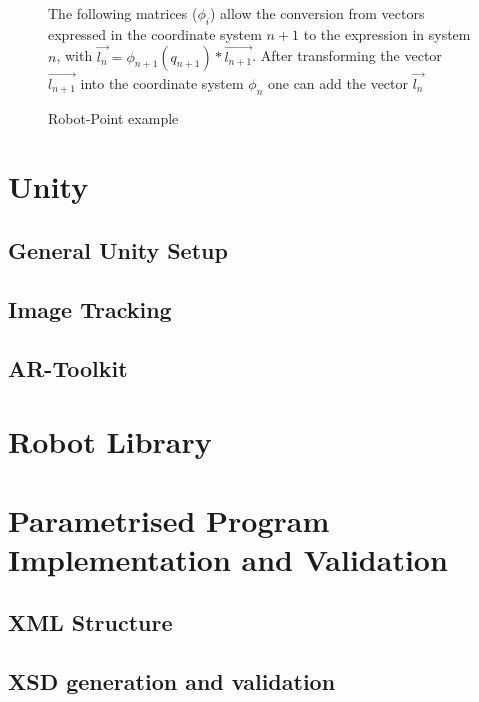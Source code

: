 \begin{figure}[h!]
	\begin{minipage}{0.45\textwidth}
		\centering
		
		\caption{Robot-Point example}
		\label{Fig:ForwardKinematics}
	\end{minipage}\hfill
	\begin{minipage}{0.45\textwidth}
		The following matrices ($\phi_i$) allow the conversion from vectors expressed in the coordinate system $n + 1$ to the expression in system $n$, with $\vec{l_n} = \phi_{n+1}(q_{n+1}) * \vec{l_{n+1}}$. After transforming the vector $\vec{l_{n+1}}$ into the coordinate system $\phi_n$ one can add the vector $\vec{l_n}$
	\end{minipage}
\end{figure}
	
\section{Unity}




\subsection{General Unity Setup}



\subsection{Image Tracking}



\subsection{AR-Toolkit}



\section{Robot Library}



\section{Parametrised Program Implementation and Validation}



\subsection{XML Structure}



\subsection{XSD generation and validation}
